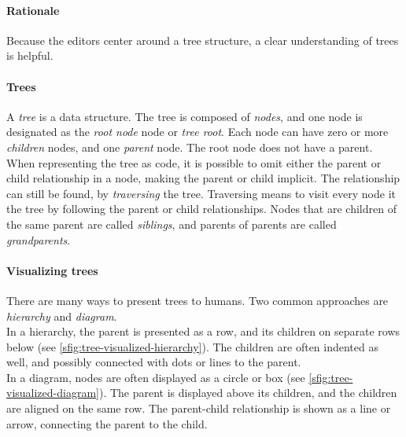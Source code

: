 \paragraph{Rationale}
Because the editors center around a tree structure, a clear understanding of trees is helpful.

\paragraph{Trees}
A \textit{tree} is a data structure.
The tree is composed of \textit{nodes}, and one node is designated as the \textit{root node} node or \textit{tree root}.
Each node can have zero or more \textit{children} nodes, and one \textit{parent} node.
The root node does not have a parent.
When representing the tree as code, it is possible to omit either the parent or child relationship in a node, making the parent or child implicit.
The relationship can still be found, by \textit{traversing} the tree.
Traversing means to visit every node it the tree by following the parent or child relationships.
Nodes that are children of the same parent are called \textit{siblings}, and parents of parents are called \textit{grandparents}.

\paragraph{Visualizing trees}
There are many ways to present trees to humans.
Two common approaches are \textit{hierarchy} and \textit{diagram}.\\

In a hierarchy, the parent is presented as a row, and its children on separate rows below (see \cref{sfig:tree-visualized-hierarchy}).
The children are often indented as well, and possibly connected with dots or lines to the parent.\\

In a diagram, nodes are often displayed as a circle or box (see \cref{sfig:tree-visualized-diagram}).
The parent is displayed above its children, and the children are aligned on the same row.
The parent-child relationship is shown as a line or arrow, connecting the parent to the child.

